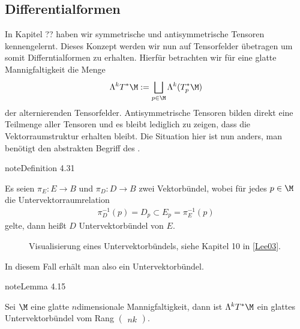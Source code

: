 \documentclass[letterpaper,10pt,english]{jupyterBook}
\let\sphinxpxdimen\pdfpxdimen\else\newdimen\sphinxpxdimen
\begin{document}
\subsection{Differentialformen}
\label{\detokenize{manifolds/diffformen:differentialformen}}\label{\detokenize{manifolds/diffformen:s-difformen}}
\sphinxAtStartPar
In Kapitel ?? haben wir symmetrische und antisymmetrische Tensoren kennengelernt. Dieses Konzept werden wir nun auf Tensorfelder übetragen um somit Differntialformen zu erhalten. Hierfür betrachten wir für eine glatte Mannigfaltigkeit die Menge
\begin{equation*}
\begin{split}\Lambda^k T^\ast\M := \bigsqcup_{p\in\M} \Lambda^k (T^\ast_p\M)\end{split}
\end{equation*}
\sphinxAtStartPar
der alternierenden Tensorfelder. Antisymmetrische Tensoren bilden direkt eine Teilmenge aller Tensoren und es bleibt lediglich zu zeigen, dass die Vektorraumstruktur erhalten bleibt. Die Situation hier ist nun anders, man benötigt den abstrakten Begriff des .
\label{manifolds/diffformen:definition-0}
\begin{sphinxadmonition}{note}{Definition 4.31}



\sphinxAtStartPar
Es seien \(\pi_E:E\to B\) und \(\pi_D:D\to B\) zwei Vektorbündel, wobei für jedes \(p\in\M\) die Untervektorraumrelation
\begin{equation*}
\begin{split}\pi_D^{-1}(p) = D_p\subset E_p = \pi_E^{-1}(p)\end{split}
\end{equation*}
\sphinxAtStartPar
gelte, dann heißt \(D\) Untervektorbündel von \(E\).
\end{sphinxadmonition}

\begin{figure}[htbp]
\centering
\capstart

\noindent\sphinxincludegraphics[height=300\sphinxpxdimen]{{subbundle}.png}
\caption{Visualisierung eines Untervektorbündels, siehe Kapitel 10 in {[}\hyperlink{cite.references:id15}{Lee03}{]}.}\label{\detokenize{manifolds/diffformen:fig-subbundle}}\end{figure}

\sphinxAtStartPar
In diesem Fall erhält man also ein Untervektorbündel.
\label{manifolds/diffformen:lemma-1}
\begin{sphinxadmonition}{note}{Lemma 4.15}



\sphinxAtStartPar
Sei \(\M\) eine glatte \(n\)\sphinxhyphen{}dimensionale Mannigfaltigkeit, dann ist \(\Lambda^k T^\ast\M\) ein glattes Untervektorbündel vom Rang \(\begin{pmatrix} n k \end{pmatrix}\).
\end{sphinxadmonition}
\end{document}

